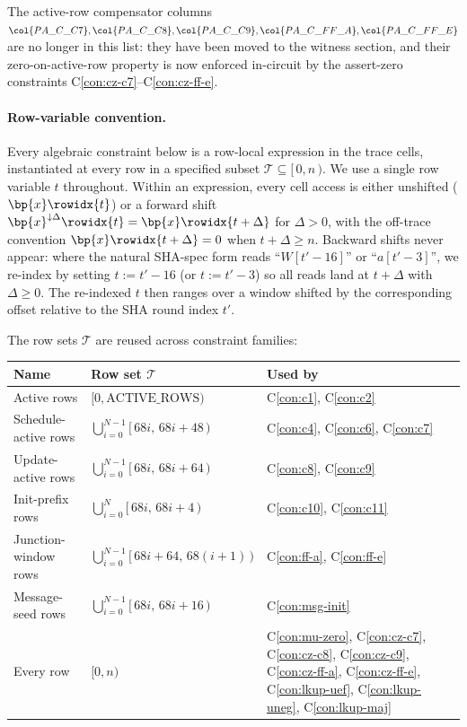The active-row compensator columns
$\col{PA\_C\_C7}, \col{PA\_C\_C8}, \col{PA\_C\_C9}, \col{PA\_C\_FF\_A}, \col{PA\_C\_FF\_E}$
are no longer in this list: they have been moved to the witness
section, and their zero-on-active-row property is now enforced
in-circuit by the assert-zero constraints
C\ref{con:cz-c7}--C\ref{con:cz-ff-e}.

\paragraph{Row-variable convention.}\label{sec:row-conv}

Every algebraic constraint below is a row-local expression in the
trace cells, instantiated at every row in a specified subset
$\mathcal{T} \subseteq [\,0, n\,)$. We use a single row variable
$t$ throughout. Within an expression, every cell access is either
unshifted ($\bp{x}\rowidx{t}$) or a forward shift
$\bp{x}^{\downarrow\Delta}\rowidx{t} = \bp{x}\rowidx{t+\Delta}$
for $\Delta > 0$, with the off-trace convention
$\bp{x}\rowidx{t+\Delta} = 0$ when $t + \Delta \ge n$. Backward
shifts never appear: where the natural SHA-spec form reads
``$W[t'-16]$'' or ``$a[t'-3]$'', we re-index by setting $t := t'-16$
(or $t := t'-3$) so all reads land at $t + \Delta$ with
$\Delta \ge 0$. The re-indexed $t$ then ranges over a window
shifted by the corresponding offset relative to the SHA round
index $t'$.

\smallskip

The row sets $\mathcal{T}$ are reused across constraint families:
\begin{center}
\small
\begin{tabular}{lll}
\toprule
\textbf{Name} & \textbf{Row set $\mathcal{T}$} & \textbf{Used by} \\
\midrule
Active rows           & $[0, \mathrm{ACTIVE\_ROWS})$ & C\ref{con:c1}, C\ref{con:c2} \\
Schedule-active rows  & $\bigcup_{i=0}^{N-1} [\,68i,\,68i + 48\,)$ & C\ref{con:c4}, C\ref{con:c6}, C\ref{con:c7} \\
Update-active rows    & $\bigcup_{i=0}^{N-1} [\,68i,\,68i + 64\,)$ & C\ref{con:c8}, C\ref{con:c9} \\
Init-prefix rows      & $\bigcup_{i=0}^{N}   [\,68i,\,68i + 4\,)$  & C\ref{con:c10}, C\ref{con:c11} \\
Junction-window rows  & $\bigcup_{i=0}^{N-1} [\,68i + 64,\,68(i{+}1)\,)$ & C\ref{con:ff-a}, C\ref{con:ff-e} \\
Message-seed rows     & $\bigcup_{i=0}^{N-1} [\,68i,\,68i + 16\,)$ & C\ref{con:msg-init} \\
Every row             & $[0, n)$                                  & C\ref{con:mu-zero}, C\ref{con:cz-c7}, C\ref{con:cz-c8}, C\ref{con:cz-c9}, C\ref{con:cz-ff-a}, C\ref{con:cz-ff-e}, C\ref{con:lkup-uef}, C\ref{con:lkup-uneg}, C\ref{con:lkup-maj} \\
\bottomrule
\end{tabular}
\end{center}

